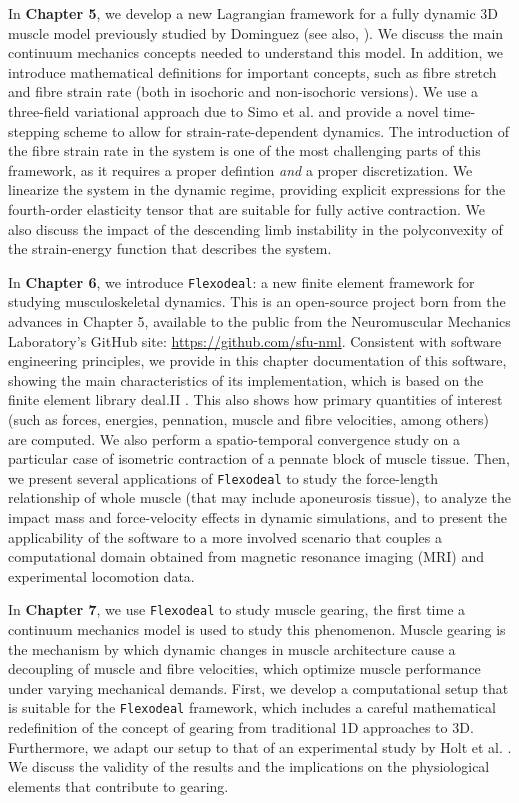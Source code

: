 \documentclass{sfuthesis}
\numberwithin{equation}{section}
\numberwithin{figure}{chapter}
\numberwithin{table}{chapter}
\theoremstyle{definition}
\begin{document}
In \textbf{Chapter 5}, we develop a new Lagrangian framework for a fully dynamic 3D muscle model previously studied by Dominguez \cite{Seba} (see also, \cite{Paper3_RossEtAl2021}). We discuss the main continuum mechanics concepts needed to understand this model. In addition, we introduce mathematical definitions for important concepts, such as fibre stretch and fibre strain rate (both in isochoric and non-isochoric versions).
We use a three-field variational approach due to Simo et al. \cite{SimoTaylorPister1985} and provide a novel time-stepping scheme to allow for strain-rate-dependent dynamics. 
The introduction of the fibre strain rate in the system is one of the most challenging parts of this framework, as it requires a proper defintion \textit{and} a proper discretization.
We linearize the system in the dynamic regime, providing explicit expressions for the fourth-order elasticity tensor that are suitable for fully active contraction. We also discuss the impact of the descending limb instability in the polyconvexity of the strain-energy function that describes the system.

In \textbf{Chapter 6}, we introduce \texttt{Flexodeal}: a new finite element framework for studying musculoskeletal dynamics. This is an open-source project born from the advances in Chapter 5, available to the public from the Neuromuscular Mechanics Laboratory's GitHub site: \url{https://github.com/sfu-nml}. Consistent with software engineering principles, we provide in this chapter documentation of this software, showing the main characteristics of its implementation, which is based on the finite element library deal.II \cite{dealii}. This also shows how primary quantities of interest (such as forces, energies, pennation, muscle and fibre velocities, among others) are computed. We also perform a spatio-temporal convergence study on a particular case of isometric contraction of a pennate block of muscle tissue. Then, we present several applications of \texttt{Flexodeal} to study the force-length relationship of whole muscle (that may include aponeurosis tissue), to analyze the impact mass and force-velocity effects in dynamic simulations, and to present the applicability of the software to a more involved scenario that couples a computational domain obtained from magnetic resonance imaging (MRI) and experimental locomotion data.

In \textbf{Chapter 7}, we use \texttt{Flexodeal} to study muscle gearing, the first time a continuum mechanics model is used to study this phenomenon. Muscle gearing is the mechanism by which dynamic changes in muscle architecture cause a decoupling of muscle and fibre velocities, which optimize muscle performance under varying mechanical demands. First, we develop a computational setup that is suitable for the \texttt{Flexodeal} framework, which includes a careful mathematical redefinition of the concept of gearing from traditional 1D approaches to 3D. Furthermore, we adapt our setup to that of an experimental study by Holt et al. \cite{Holt2016}. We discuss the validity of the results and the implications on the physiological elements that contribute to gearing.
\end{document}
